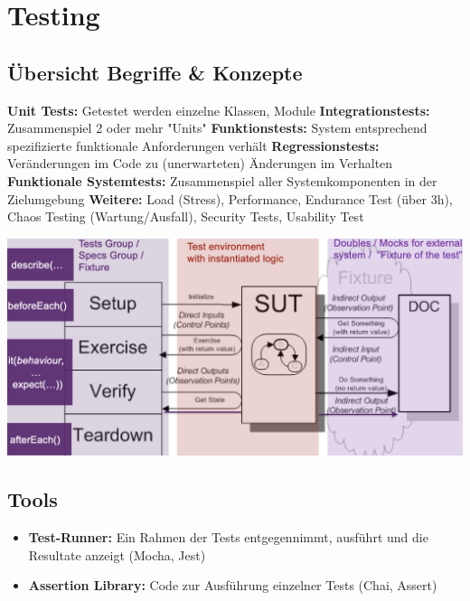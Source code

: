 
\section{Testing}


\subsection{Übersicht Begriffe \& Konzepte}
\textbf{Unit Tests:} Getestet werden einzelne Klassen, Module
\textbf{Integrationstests:} Zusammenspiel 2 oder mehr "Units"
\textbf{Funktionstests:} System entsprechend spezifizierte funktionale Anforderungen verhält
\textbf{Regressionstests:} Veränderungen im Code zu (unerwarteten) Änderungen im Verhalten
\textbf{Funktionale Systemtests:} Zusammenspiel aller Systemkomponenten in der Zielumgebung
\textbf{Weitere:} Load (Stress), Performance, Endurance Test (über 3h), Chaos Testing (Wartung/Ausfall), Security Tests, Usability Test

\vspace{-8pt}
\begin{center}
    \includegraphics[width=\linewidth]{graphic/testing/Unit-Testing.png}
\end{center}
\vspace{-8pt}

\subsection{Tools}
\begin{itemize}
    \item \textbf{Test-Runner:} Ein Rahmen der Tests entgegennimmt, ausführt und die Resultate anzeigt (Mocha, Jest)
    \item \textbf{Assertion Library:} Code zur Ausführung einzelner Tests (Chai, Assert)
\end{itemize}




